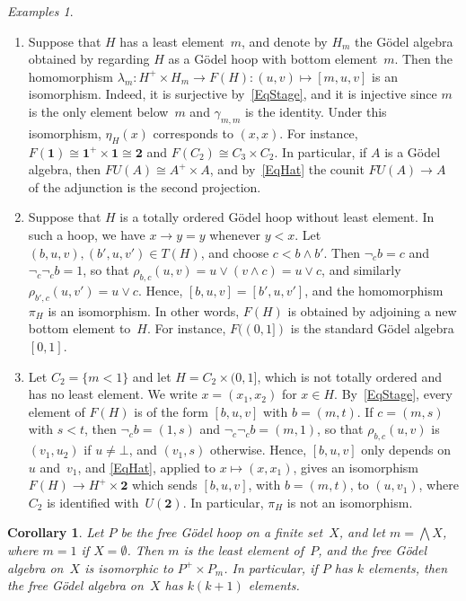 \documentclass[reqno,a4paper]{amsart}
\theoremstyle{plain}
\newtheorem{corollary}[subsection]{Corollary}
\theoremstyle{definition}
\theoremstyle{remark}
\newtheorem{examples}[subsection]{Examples}
\numberwithin{equation}{section}
\newcommand{\two}{\mathbf{2}}
\newcommand{\one}{\mathbf{1}}
\begin{document}
\begin{examples}\label{ExExamples}{\ }
\begin{enumerate}
\item Suppose that $H$ has a least element~$m$, and denote by $H_m$ the G\"odel algebra obtained by regarding $H$ as a G\"odel hoop with bottom element~$m$. Then the homomorphism $\lambda_m\colon H^+\times H_m\to F(H)\colon(u,v)\mapsto[m,u,v]$ is an isomorphism. Indeed, it is surjective by~\eqref{EqStage}, and it is injective since $m$ is the only element below~$m$ and $\gamma_{m,m}$ is the identity. Under this isomorphism, $\eta_H(x)$ corresponds to $(x,x)$. For instance, $F(\one)\cong\one^+\times\one\cong\two$ and $F(C_2)\cong C_3\times C_2$. In particular, if $A$ is a G\"odel algebra, then $FU(A)\cong A^+\times A$, and by~\eqref{EqHat} the counit $FU(A)\to A$ of the adjunction is the second projection.
\item Suppose that $H$ is a totally ordered G\"odel hoop without least element. In such a hoop, we have $x\to y=y$ whenever $y<x$. Let $(b,u,v),(b',u,v')\in T(H)$, and choose $c<b\wedge b'$. Then $\neg_c b=c$ and $\neg_c\neg_c b=1$, so that $\rho_{b,c}(u,v)=u\vee(v\wedge c)=u\vee c$, and similarly $\rho_{b',c}(u,v')=u\vee c$. Hence, $[b,u,v]=[b',u,v']$, and the homomorphism~$\pi_H$ is an isomorphism. In other words, $F(H)$ is obtained by adjoining a new bottom element to~$H$. For instance, $F((0,1])$ is the standard G\"odel algebra $[0,1]$.
\item Let $C_2=\{m<1\}$ and let $H=C_2\times(0,1]$, which is not totally ordered and has no least element. We write $x=(x_1,x_2)$ for $x\in H$. By~\eqref{EqStage}, every element of $F(H)$ is of the form $[b,u,v]$ with $b=(m,t)$. If $c=(m,s)$ with $s<t$, then $\neg_c b=(1,s)$ and $\neg_c\neg_c b=(m,1)$, so that $\rho_{b,c}(u,v)$ is $(v_1,u_2)$ if $u\neq\bot$, and $(v_1,s)$ otherwise. Hence, $[b,u,v]$ only depends on $u$ and~$v_1$, and \eqref{EqHat}, applied to $x\mapsto(x,x_1)$, gives an isomorphism $F(H)\to H^+\times\two$ which sends $[b,u,v]$, with $b=(m,t)$, to $(u,v_1)$, where $C_2$ is identified with~$U(\two)$. In particular, $\pi_H$ is not an isomorphism.
\end{enumerate}
\end{examples}

\begin{corollary}\label{CorFree}
Let $P$ be the free G\"odel hoop on a finite set~$X$, and let $m=\bigwedge X$, where $m=1$ if $X=\emptyset$. Then $m$ is the least element of~$P$, and the free G\"odel algebra on~$X$ is isomorphic to $P^+\times P_m$. In particular, if $P$ has $k$ elements, then the free G\"odel algebra on~$X$ has $k(k+1)$ elements.
\end{corollary}
\end{document}

